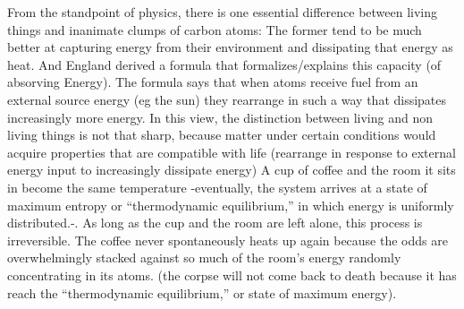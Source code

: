 \documentclass[onecollarge,runningheads]{svjour2}
\begin{document}
From the standpoint of physics, there is one essential difference between living things and inanimate clumps of carbon atoms: The former tend to be much better at capturing energy from their environment and dissipating that energy as heat. And England derived a formula that formalizes/explains this capacity (of absorving Energy).
The formula says that when atoms receive fuel from an external source energy (eg the sun) they rearrange in such a way that dissipates increasingly more  energy.
In this view, the distinction between living and non living things is not that sharp, because matter under certain conditions would acquire properties that are compatible with life (rearrange in response to external energy input to increasingly dissipate energy)
A cup of coffee and the room it sits in become the same temperature -eventually, the system arrives at a state of maximum entropy or “thermodynamic equilibrium,” in which energy is uniformly distributed.-. As long as the cup and the room are left alone, this process is irreversible. The coffee never spontaneously heats up again because the odds are overwhelmingly stacked against so much of the room’s energy randomly concentrating in its atoms.
(the corpse will not come back to death because it has reach the  “thermodynamic equilibrium,” or state of maximum energy).
\end{document}
